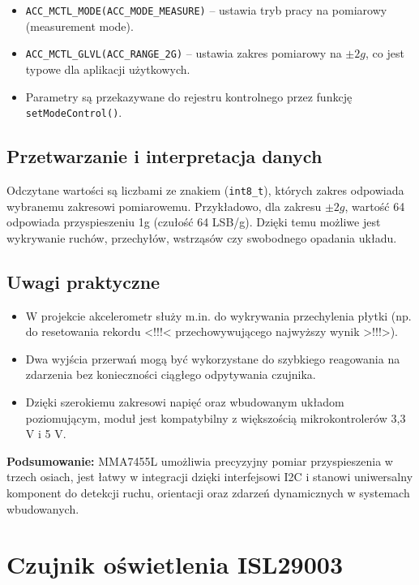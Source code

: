 \documentclass[letterpaper,11pt]{report}
\begin{document}
\begin{itemize}
    \item \texttt{ACC\_MCTL\_MODE(ACC\_MODE\_MEASURE)} – ustawia tryb pracy na pomiarowy (measurement mode).
    \item \texttt{ACC\_MCTL\_GLVL(ACC\_RANGE\_2G)} – ustawia zakres pomiarowy na \(\pm2g\), co jest typowe dla aplikacji użytkowych.
    \item Parametry są przekazywane do rejestru kontrolnego przez funkcję \texttt{setModeControl()}.
\end{itemize}

\subsection*{Przetwarzanie i interpretacja danych}

Odczytane wartości są liczbami ze znakiem (\texttt{int8\_t}), których zakres odpowiada wybranemu zakresowi pomiarowemu. Przykładowo, dla zakresu \(\pm2g\), wartość 64 odpowiada przyspieszeniu 1g (czułość 64 LSB/g). Dzięki temu możliwe jest wykrywanie ruchów, przechyłów, wstrząsów czy swobodnego opadania układu.

\subsection*{Uwagi praktyczne}

\begin{itemize}
    \item W projekcie akcelerometr służy m.in. do wykrywania przechylenia płytki (np. do resetowania rekordu <!!!< przechowywującego najwyższy wynik >!!!>).
    \item Dwa wyjścia przerwań mogą być wykorzystane do szybkiego reagowania na zdarzenia bez konieczności ciągłego odpytywania czujnika.
    \item Dzięki szerokiemu zakresowi napięć oraz wbudowanym układom poziomującym, moduł jest kompatybilny z większością mikrokontrolerów 3,3 V i 5 V.
\end{itemize}

\textbf{Podsumowanie:}  
MMA7455L umożliwia precyzyjny pomiar przyspieszenia w trzech osiach, jest łatwy w integracji dzięki interfejsowi I2C i stanowi uniwersalny komponent do detekcji ruchu, orientacji oraz zdarzeń dynamicznych w systemach wbudowanych.

\section{Czujnik oświetlenia ISL29003}
\end{document}
